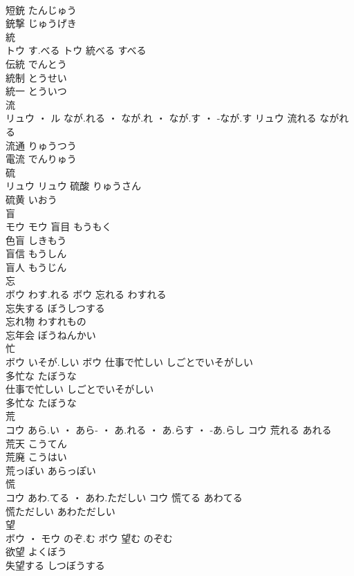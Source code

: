 \documentclass[8pt]{extreport}
\begin{document}
\begin{CJK}{UTF8}{min}
\\	短銃	たんじゅう	
\\	銃撃	じゅうげき	
\\	統	
\\	トウ	す.べる	トウ	統べる	すべる	
\\	伝統	でんとう	
\\	統制	とうせい	
\\	統一	とういつ	
\\	流	
\\	リュウ ・ ル	なが.れる ・ なが.れ ・ なが.す ・ -なが.す	リュウ	流れる	ながれる	
\\	流通	りゅうつう	
\\	電流	でんりゅう	
\\	硫	
\\	リュウ		リュウ	硫酸	りゅうさん	
\\	硫黄	いおう	
\\	盲	
\\	モウ		モウ	盲目	もうもく	
\\	色盲	しきもう	
\\	盲信	もうしん	
\\	盲人	もうじん	
\\	忘	
\\	ボウ	わす.れる	ボウ	忘れる	わすれる	
\\	忘失する	ぼうしつする	
\\	忘れ物	わすれもの	
\\	忘年会	ぼうねんかい	
\\	忙	
\\	ボウ	いそが.しい	ボウ	仕事で忙しい	しごとでいそがしい	
\\	多忙な	たぼうな	
\\	仕事で忙しい	しごとでいそがしい	
\\	多忙な	たぼうな	
\\	荒	
\\	コウ	あら.い ・ あら- ・ あ.れる ・ あ.らす ・ -あ.らし	コウ	荒れる	あれる	
\\	荒天	こうてん	
\\	荒廃	こうはい	
\\	荒っぽい	あらっぽい	
\\	慌	
\\	コウ	あわ.てる ・ あわ.ただしい	コウ	慌てる	あわてる	
\\	慌ただしい	あわただしい	
\\	望	
\\	ボウ ・ モウ	のぞ.む	ボウ	望む	のぞむ	
\\	欲望	よくぼう	
\\	失望する	しつぼうする	

\end{CJK}
\end{document}
